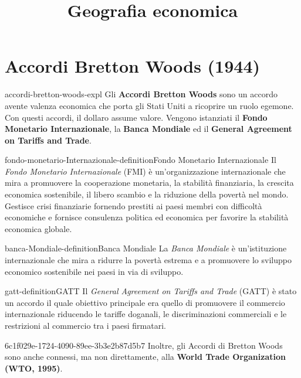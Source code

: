 \documentclass[preview]{standalone}
\begin{document}
\title{Geografia economica}
\genpage

\section{Accordi Bretton Woods (1944)}

\begin{snippet}{accordi-bretton-woods-expl}
    Gli \textbf{Accordi Bretton Woods} sono un accordo avente valenza economica
    che porta gli Stati Uniti a ricoprire un ruolo egemone. Con questi accordi, il
    dollaro assume valore. Vengono istanziati il \textbf{Fondo Monetario Internazionale},
    la \textbf{Banca Mondiale} ed il \textbf{General Agreement on Tariffs and Trade}.
\end{snippet}

\begin{snippetdefinition}{fondo-monetario-Internazionale-definition}{Fondo Monetario Internazionale}
    Il \textit{Fondo Monetario Internazionale} (FMI) è un'organizzazione internazionale che mira a promuovere
    la cooperazione monetaria, la stabilità finanziaria,
    la crescita economica sostenibile, il libero scambio e la riduzione della povertà nel mondo.
    Gestisce crisi finanziarie fornendo prestiti ai paesi membri con difficoltà economiche e
    fornisce consulenza politica ed economica per favorire la stabilità economica globale.
\end{snippetdefinition}

\begin{snippetdefinition}{banca-Mondiale-definition}{Banca Mondiale}
    La \textit{Banca Mondiale} è un'istituzione internazionale che mira a ridurre la povertà
    estrema e a promuovere lo sviluppo economico sostenibile nei paesi in via di sviluppo.
\end{snippetdefinition}

\begin{snippetdefinition}{gatt-definition}{GATT}
    Il \textit{General Agreement on Tariffs and Trade} (GATT)
    è stato un accordo il quale obiettivo principale era quello
    di promuovere il commercio internazionale riducendo le tariffe doganali,
    le discriminazioni commerciali e le restrizioni al commercio tra i paesi firmatari. 
\end{snippetdefinition}

\begin{snippet}{6c1f029e-1724-4090-89ee-3b3e2b87d5b7}
    Inoltre, gli Accordi di Bretton Woods sono anche connessi, ma non direttamente,
    alla \textbf{World Trade Organization (WTO, 1995)}.
\end{snippet}
\end{document}
